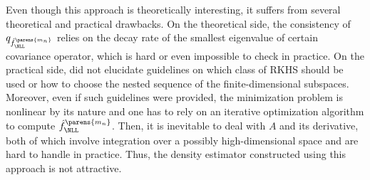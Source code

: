 \documentclass[12pt]{article}
\theoremstyle{definition}
\theoremstyle{theorem}
\theoremstyle{remark}
\begin{document}
Even though this approach is theoretically interesting, it suffers from several theoretical and practical drawbacks. On the theoretical side, the consistency of $q_{\hat{f}_{\NLL}^{\parens{m_n}}}$ relies on the decay rate of the smallest eigenvalue of certain covariance operator, which is hard or even impossible to check in practice. On the practical side, \textcites{Fukumizu2005-mf} did not elucidate guidelines on which class of RKHS should be used or how to choose the nested sequence of the finite-dimensional subspaces. Moreover, even if such guidelines were provided, the minimization problem is nonlinear by its nature and one has to rely on an iterative optimization algorithm to compute $\hat{f}_{\NLL}^{\parens{m_n}}$. Then, it is inevitable to deal with $A$ and its derivative, both of which involve integration over a possibly high-dimensional space and are hard to handle in practice. Thus, the density estimator constructed using this approach is not attractive. 

\end{document}
